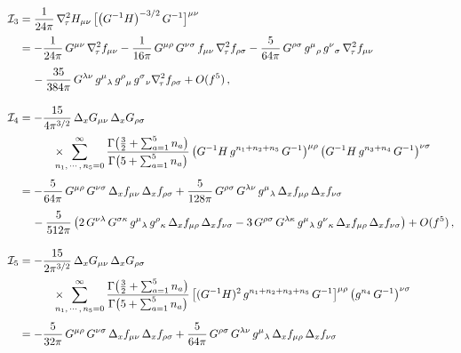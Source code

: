 \documentclass[11pt]{article}
\newcommand{\CI}{\mathcal{I}}
\begin{document}
\begin{align*}
	\CI_3 & = \frac{1}{24 \pi} \, \nabla_{\!\tau}^2 H_{\mu\nu} \, \bigl[ \bigl( G^{-1} H \bigr)^{-3/2} \, G^{-1} \bigr]^{\mu\nu} \notag \\[2pt]
		& = - \frac{1}{24\pi} \, G^{\mu\nu} \, \nabla_{\!\tau}^2 f_{\mu\nu} - \frac{1}{16\pi} \, G^{\mu\rho} \, G^{\nu\sigma} \, f_{\mu\nu} \, \nabla_{\!\tau}^2 f_{\rho\sigma} - \frac{5}{64\pi} \, G^{\rho\sigma} \, g^\mu{}_\rho \, g^\nu{}_\sigma \, \nabla_{\!\tau}^2 f_{\mu\nu} \notag \\[4pt]
		& \quad\hspace{0.5mm} - \frac{35}{384 \pi} \, G^{\lambda\nu} \, g^\mu{}_\lambda \, g^\rho{}_\mu \, g^\sigma{}_\nu \nabla_{\!\tau}^2 f_{\rho\sigma} + O(f^5) \,, \\[10pt]
	\CI_4 & = - \frac{15}{4\pi^{3/2}} \, \Delta_x G_{\mu\nu} \, \Delta_x G_{\rho\sigma} \notag \\[2pt]
		& \qquad\quad \times \!\!\!\!\!\! \sum_{n_1, \, \cdots, \, n_5 = 0}^\infty \frac{\Gamma \bigl( \tfrac{3}{2} + \sum_{a = 1}^5 n_a \bigr)}{\Gamma \bigl( 5 + \sum_{a = 1}^5 n_a \bigr)} \, \bigl( G^{-1} H \, g^{n_1 + n_2 + n_5} \, G^{-1} \bigr)^{\mu\rho} \, \bigl( G^{-1} H \, g^{n_3 + n_4} \, G^{-1} \bigr)^{\nu\sigma} \notag \\[4pt]
		& = - \frac{5}{64\pi} \, G^{\mu\rho} \, G^{\nu\sigma} \, \Delta_{x} f_{\mu\nu} \, \Delta_{x} f_{\rho\sigma} + \frac{5}{128 \pi} \, G^{\rho\sigma} \, G^{\lambda\nu} \, g^\mu{}_\lambda \, \Delta_{x} f_{\mu\rho} \, \Delta_{x} f_{\nu\sigma} \notag \\[4pt]
		& \quad\hspace{0.5mm} - \frac{5}{512 \pi} \, \bigl( 2 \, G^{\nu\lambda} \, G^{\sigma \kappa} \, g^\mu{}_\lambda \, g^\rho{}_\kappa \, \Delta_{x} f_{\mu\rho} \, \Delta_{x} f_{\nu\sigma} - 3 \, G^{\rho\sigma} \, G^{\lambda \kappa} \, g^\mu{}_\lambda \, g^\nu{}_\kappa \, \Delta_{x} f_{\mu\rho} \, \Delta_{x} f_{\nu\sigma} \bigr) + O (f^5) \,, \\[10pt]
	\CI_5 & = - \frac{15}{2\pi^{3/2}} \, \Delta_x G_{\mu\nu} \, \Delta_x G_{\rho\sigma} \notag \\[2pt]
		& \qquad\quad \times \!\!\!\!\!\! \sum_{n_1, \, \cdots, \, n_5 = 0}^\infty \frac{\Gamma \bigl( \tfrac{3}{2} + \sum_{a = 1}^5 n_a \bigr)}{\Gamma \bigl( 5 + \sum_{a = 1}^5 n_a \bigr)} \, \bigl[ (G^{-1} H)^2 \, g^{n_1 + n_2 + n_3 + n_5} \, G^{-1} \bigr]^{\mu\rho} \, \bigl( g^{n_4} \, G^{-1} \bigr)^{\nu\sigma} \notag \\[4pt]
		& = - \frac{5}{32\pi} \, G^{\mu\rho} \, G^{\nu\sigma} \, \Delta_{x} f_{\mu\nu} \, \Delta_{x} f_{\rho\sigma} + \frac{5}{64 \pi} \, G^{\rho\sigma} \, G^{\lambda\nu} \, g^\mu{}_\lambda \, \Delta_{x} f_{\mu\rho} \, \Delta_{x} f_{\nu\sigma} \notag \\[4pt]

\end{align*}
\end{document}
